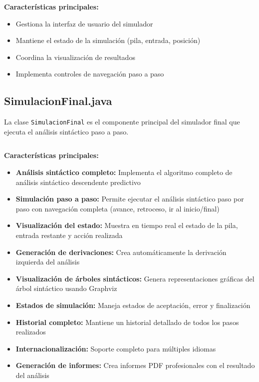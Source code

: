 \inputminted[linenos,breaklines,firstline=1,lastline=40]{java}{codigo/src/simulador/PanelSimulacion.java}

\textbf{Características principales:}

\begin{itemize}
    \item Gestiona la interfaz de usuario del simulador
    \item Mantiene el estado de la simulación (pila, entrada, posición)
    \item Coordina la visualización de resultados
    \item Implementa controles de navegación paso a paso
\end{itemize}

\subsection{SimulacionFinal.java}

La clase \texttt{SimulacionFinal} es el componente principal del simulador final que ejecuta el análisis sintáctico paso a paso.

\inputminted[linenos,breaklines,firstline=1,lastline=100]{java}{codigo/src/simulador/SimulacionFinal.java}

\textbf{Características principales:}

\begin{itemize}
    \item \textbf{Análisis sintáctico completo:} Implementa el algoritmo completo de análisis sintáctico descendente predictivo
    \item \textbf{Simulación paso a paso:} Permite ejecutar el análisis sintáctico paso por paso con navegación completa (avance, retroceso, ir al inicio/final)
    \item \textbf{Visualización del estado:} Muestra en tiempo real el estado de la pila, entrada restante y acción realizada
    \item \textbf{Generación de derivaciones:} Crea automáticamente la derivación izquierda del análisis
    \item \textbf{Visualización de árboles sintácticos:} Genera representaciones gráficas del árbol sintáctico usando Graphviz
    \item \textbf{Estados de simulación:} Maneja estados de aceptación, error y finalización
    \item \textbf{Historial completo:} Mantiene un historial detallado de todos los pasos realizados
    \item \textbf{Internacionalización:} Soporte completo para múltiples idiomas
    \item \textbf{Generación de informes:} Crea informes PDF profesionales con el resultado del análisis
\end{itemize}

